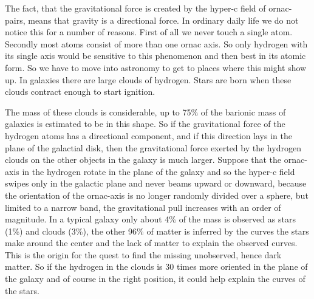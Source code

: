 The fact, that the gravitational force is created by the hyper-c field of ornac-pairs, means that gravity is a directional force. In ordinary daily life we do not notice this for a number of reasons. First of all we never touch a single atom. Secondly most atoms consist of more than one ornac axis. So only hydrogen with its single axis would be sensitive to this phenomenon and then best in its atomic form. So we have to move into astronomy to get to places where this might show up. In galaxies there are large clouds of hydrogen. Stars are born when these clouds contract enough to start ignition.

The mass of these clouds is considerable, up to 75\% of the barionic mass of galaxies is estimated to be in this shape. So if the gravitational force of the hydrogen atoms has a directional component, and if this direction lays in the plane of the galactial disk, then the gravitational force exerted by the hydrogen clouds on the other objects in the galaxy is much larger. Suppose that the ornac-axis in the hydrogen rotate in the plane of the galaxy and so the hyper-c field swipes only in the galactic plane and never beams upward or downward, because the orientation of the ornac-axis is no longer randomly divided over a sphere, but limited to a narrow band, the gravitational pull increases with an order of magnitude.
In a typical galaxy only about 4\% of the mass is observed as stars (1\%) and clouds (3\%), the other 96\% of matter is inferred by the curves the stars make around the center and the lack of matter to explain the observed curves. This is the origin for the quest to find the missing unobserved, hence dark matter. So if the hydrogen in the clouds is 30 times more oriented in the plane of the galaxy and of course in the right position, it could help explain the curves of the stars.

